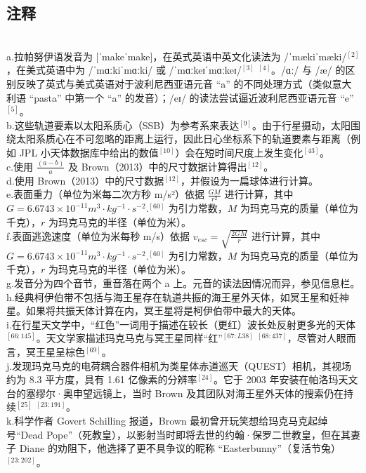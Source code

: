 \subsection{注释}\\
a.拉帕努伊语发音为 [ˈmakeˈmake]，在英式英语中英文化读法为 /ˈmækiˈmæki/$^{[2]}$，在美式英语中为 /ˈmɑːkiˈmɑːki/ 或 /ˈmɑːkeɪˈmɑːkeɪ/$^{[3]}$ $^{[4]}$。/ɑː/ 与 /æ/ 的区别反映了英式与美式英语对于波利尼西亚语元音 “a” 的不同处理方式（类似意大利语 “pasta” 中第一个 “a” 的发音）；/eɪ/ 的读法尝试逼近波利尼西亚语元音 “e”$^{[5]}$。\\
b.这些轨道要素以太阳系质心（SSB）为参考系来表达$^{[9]}$。由于行星摄动，太阳围绕太阳系质心在不可忽略的距离上运行，因此日心坐标系下的轨道要素与距离（例如 JPL 小天体数据库中给出的数值$^{[10]}$）会在短时间尺度上发生变化$^{[43]}$。\\
c.使用 $\frac{(a - b)}{a}$ 及 Brown（2013）中的尺寸数据计算得出$^{[12]}$。\\
d.使用 Brown（2013）中的尺寸数据$^{[12]}$，并假设为一扁球体进行计算。\\
e.表面重力（单位为米每二次方秒 m/s²）依据
$\frac{GM}{r^{2}}$
进行计算，其中$G = 6.6743\times10^{-11} m^3\cdot kg^{-1}\cdot s^{-2}$.$^{[60]}$ 为引力常数，$M$ 为玛克马克的质量（单位为千克），$r$ 为玛克马克的半径（单位为米）。\\
f.表面逃逸速度（单位为米每秒 m/s）依据
$v_{esc} = \sqrt{\frac{2GM}{r}}$
进行计算，其中 $G = 6.6743\times10^{-11}m^3\cdot kg^{-1}\cdot s^{-2}$.$^{[60]}$ 为引力常数，$M$ 为玛克马克的质量（单位为千克），$r$ 为玛克马克的半径（单位为米）。\\
g.发音分为四个音节，重音落在两个 a 上。元音的读法因情况而异，参见信息栏。
h.经典柯伊伯带不包括与海王星存在轨道共振的海王星外天体，如冥王星和妊神星。如果将共振天体计算在内，冥王星将是柯伊伯带中最大的天体。\\
i.在行星天文学中，“红色”一词用于描述在较长（更红）波长处反射更多光的天体$^{[66:145]}$。天文学家描述玛克马克与冥王星同样“红”$^{[67:L38]}$ $^{[68:437]}$，尽管对人眼而言，冥王星呈棕色$^{[69]}$。\\
j.发现玛克马克的电荷耦合器件相机为类星体赤道巡天（QUEST）相机，其视场约为 8.3 平方度，具有 1.61 亿像素的分辨率$^{[24]}$。它于 2003 年安装在帕洛玛天文台的塞缪尔·奥申望远镜上，当时 Brown 及其团队对海王星外天体的搜索仍在持续$^{[25]}$ $^{[23:191]}$。\\
k.科学作者 Govert Schilling 报道，Brown 最初曾开玩笑想给玛克马克起绰号“Dead Pope”（死教皇），以影射当时即将去世的约翰·保罗二世教皇，但在其妻子 Diane 的劝阻下，他选择了更不具争议的昵称 “Easterbunny”（复活节兔）$^{[23:202]}$。\\
